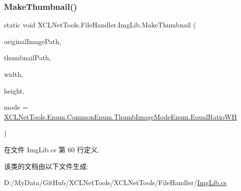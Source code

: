 \subsubsection{\texorpdfstring{Make\+Thumbnail()}{MakeThumbnail()}}
{\footnotesize\ttfamily static void X\+C\+L\+Net\+Tools.\+File\+Handler.\+Img\+Lib.\+Make\+Thumbnail (\begin{DoxyParamCaption}\item[{string}]{original\+Image\+Path,  }\item[{string}]{thumbnail\+Path,  }\item[{int}]{width,  }\item[{int}]{height,  }\item[{\hyperlink{class_x_c_l_net_tools_1_1_enum_1_1_common_enum_abb6d9d6cd508fc9ced27b814afb38974}{X\+C\+L\+Net\+Tools.\+Enum.\+Common\+Enum.\+Thumb\+Image\+Mode\+Enum}}]{mode = {\ttfamily \hyperlink{class_x_c_l_net_tools_1_1_enum_1_1_common_enum_abb6d9d6cd508fc9ced27b814afb38974ad2346d2aff378b001c28eaa423ca1a3a}{X\+C\+L\+Net\+Tools.\+Enum.\+Common\+Enum.\+Thumb\+Image\+Mode\+Enum.\+Equal\+Ratio\+WH}} }\end{DoxyParamCaption})\hspace{0.3cm}{\ttfamily [static]}}



在文件 Img\+Lib.\+cs 第 60 行定义.



该类的文档由以下文件生成\+:\begin{DoxyCompactItemize}
\item 
D\+:/\+My\+Data/\+Git\+Hub/\+X\+C\+L\+Net\+Tools/\+X\+C\+L\+Net\+Tools/\+File\+Handler/\hyperlink{_img_lib_8cs}{Img\+Lib.\+cs}\end{DoxyCompactItemize}
